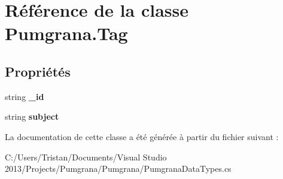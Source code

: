 \hypertarget{class_pumgrana_1_1_tag}{\section{Référence de la classe Pumgrana.\+Tag}
\label{class_pumgrana_1_1_tag}
}
\subsection*{Propriétés}
\begin{DoxyCompactItemize}
\item 
\hypertarget{class_pumgrana_1_1_tag_a0664f91a3daa38158a9723f8257df87f}{string {\bfseries \+\_\+id}}\label{class_pumgrana_1_1_tag_a0664f91a3daa38158a9723f8257df87f}

\item 
\hypertarget{class_pumgrana_1_1_tag_a0c7c23ff8e0bfc8fe5d0c7e037edaf97}{string {\bfseries subject}}\label{class_pumgrana_1_1_tag_a0c7c23ff8e0bfc8fe5d0c7e037edaf97}

\end{DoxyCompactItemize}


La documentation de cette classe a été générée à partir du fichier suivant \+:\begin{DoxyCompactItemize}
\item 
C\+:/\+Users/\+Tristan/\+Documents/\+Visual Studio 2013/\+Projects/\+Pumgrana/\+Pumgrana/Pumgrana\+Data\+Types.\+cs\end{DoxyCompactItemize}
